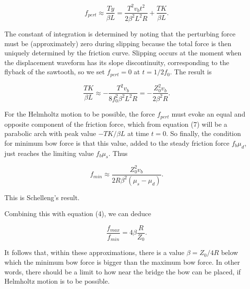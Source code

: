   \begin{equation*}f_{pert} \approx \dfrac{Ty}{\beta L} = \dfrac{T^2 v_b t^2}{2 
  \beta^2 L^2 R} + \dfrac{TK}{\beta L} . \tag{7}\end{equation*} 

  The constant of integration is determined by noting that the perturbing force 
  must be (approximately) zero during slipping because the total force is then 
  uniquely determined by the friction curve. Slipping occurs at the moment when 
  the displacement waveform has its slope discontinuity, corresponding to the 
  flyback of the sawtooth, so we set $f_{pert}=0$ at $t=1/2f_0$. The result is 

  \begin{equation*}\dfrac{TK}{\beta L} \approx -\dfrac{T^2 v_b}{8f_0^2 \beta^2 
  L^2 R}= -\dfrac{Z_0^2 v_b}{2 \beta^2 R} . \tag{8} \end{equation*} 

  For the Helmholtz motion to be possible, the force $f_{pert}$ must evoke an 
  equal and opposite component of the friction force, which from equation (7) 
  will be a parabolic arch with peak value $-TK/\beta L$ at time $t=0$. So 
  finally, the condition for minimum bow force is that this value, added to the 
  steady friction force $f_b \mu_d$, just reaches the limiting value $f_b 
  \mu_s$. Thus 

  \begin{equation*}f_{min} \approx \dfrac{Z_0^2 v_b}{2 R \beta^2 (\mu_s-\mu_d)} 
  . \tag{9}\end{equation*} 

  This is Schelleng's result. 

  Combining this with equation (4), we can deduce 

  \begin{equation*}\dfrac{f_{max}}{f_{min}}=4 \beta \dfrac{R}{Z_0} . 
  \tag{10}\end{equation*} 

  It follows that, within these approximations, there is a value $\beta=Z_0/4R$ 
  below which the minimum bow force is bigger than the maximum bow force. In 
  other words, there should be a limit to how near the bridge the bow can be 
  placed, if Helmholtz motion is to be possible. 